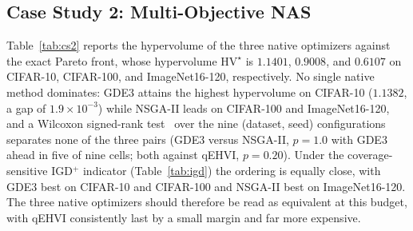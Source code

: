 \documentclass[runningheads]{llncs}
\begin{document}
\begin{table}[!ht]
\centering
\caption{Case Study 1, scalarized formulation: mean hypervolume $\pm$ std over $N_{val}=3$ seeds of the front assembled from the ten $\alpha$ runs, with the gap to the true Pareto front $(\mathrm{HV}^{\star}-\mathrm{HV})$ in parentheses; the reference point is $R=(1.1,1.1)$. The true-front hypervolume $\mathrm{HV}^{\star}$ is in the last row.}
\label{tab:cs1_scalar_hv}   
\end{table}



%
%
\subsection{Case Study 2: Multi-Objective NAS} \label{SEC4.3}
Table~\ref{tab:cs2} reports the hypervolume of the three native optimizers against the exact Pareto front, whose hypervolume $\mathrm{HV}^{\star}$ is $1.1401$, $0.9008$, and $0.6107$ on CIFAR-10, CIFAR-100, and ImageNet16-120, respectively. No single native method dominates: GDE3 attains the highest hypervolume on CIFAR-10 ($1.1382$, a gap of $1.9{\times}10^{-3}$) while NSGA-II leads on CIFAR-100 and ImageNet16-120, and a Wilcoxon signed-rank test~\cite{demsar2006statistical} over the nine (dataset, seed) configurations separates none of the three pairs (GDE3 versus NSGA-II, $p = 1.0$ with GDE3 ahead in five of nine cells; both against qEHVI, $p = 0.20$). Under the coverage-sensitive IGD$^{+}$ indicator (Table~\ref{tab:igd}) the ordering is equally close, with GDE3 best on CIFAR-10 and CIFAR-100 and NSGA-II best on ImageNet16-120. The three native optimizers should therefore be read as equivalent at this budget, with qEHVI consistently last by a small margin and far more expensive.
\end{document}
